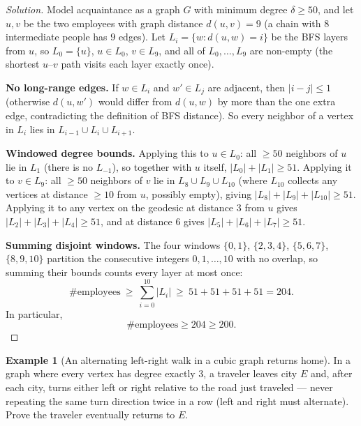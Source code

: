 \documentclass[11pt]{article}
\theoremstyle{definition}
\newtheorem{example}{Example}[section]
\begin{document}
\begin{proof}[Solution]
Model acquaintance as a graph $G$ with minimum degree $\delta\ge50$, and let $u,v$ be the two employees with graph distance $d(u,v)=9$ (a chain with $8$ intermediate people has $9$ edges). Let $L_i=\{w:d(u,w)=i\}$ be the BFS layers from $u$, so $L_0=\{u\}$, $u\in L_0$, $v\in L_9$, and all of $L_0,\dots,L_9$ are non-empty (the shortest $u$--$v$ path visits each layer exactly once).

\textbf{No long-range edges.} If $w\in L_i$ and $w'\in L_j$ are adjacent, then $|i-j|\le1$ (otherwise $d(u,w')$ would differ from $d(u,w)$ by more than the one extra edge, contradicting the definition of BFS distance). So every neighbor of a vertex in $L_i$ lies in $L_{i-1}\cup L_i\cup L_{i+1}$.

\textbf{Windowed degree bounds.} Applying this to $u\in L_0$: all $\ge50$ neighbors of $u$ lie in $L_1$ (there is no $L_{-1}$), so together with $u$ itself, $|L_0|+|L_1|\ge51$. Applying it to $v\in L_9$: all $\ge50$ neighbors of $v$ lie in $L_8\cup L_9\cup L_{10}$ (where $L_{10}$ collects any vertices at distance $\ge10$ from $u$, possibly empty), giving $|L_8|+|L_9|+|L_{10}|\ge51$. Applying it to any vertex on the geodesic at distance $3$ from $u$ gives $|L_2|+|L_3|+|L_4|\ge51$, and at distance $6$ gives $|L_5|+|L_6|+|L_7|\ge51$.

\textbf{Summing disjoint windows.} The four windows $\{0,1\}$, $\{2,3,4\}$, $\{5,6,7\}$, $\{8,9,10\}$ partition the consecutive integers $0,1,\dots,10$ with no overlap, so summing their bounds counts every layer at most once:
\[
\#\text{employees}\ \ge\ \sum_{i=0}^{10}|L_i|\ \ge\ 51+51+51+51=204.
\]
In particular,
\[
\boxed{\#\text{employees}\ge204\ge200}.
\]
\end{proof}

\begin{example}[An alternating left-right walk in a cubic graph returns home]
In a graph where every vertex has degree exactly $3$, a traveler leaves city $E$ and, after each city, turns either left or right relative to the road just traveled — never repeating the same turn direction twice in a row (left and right must alternate). Prove the traveler eventually returns to $E$.
\end{example}
\end{document}
